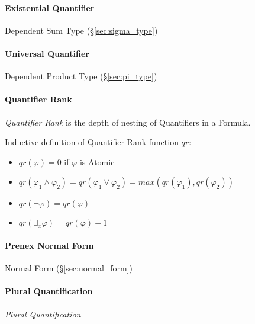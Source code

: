 \paragraph{Existential Quantifier}\label{sec:existential_quantifier}\hfill

Dependent Sum Type (\S\ref{sec:sigma_type})



\paragraph{Universal Quantifier}\label{sec:universal_quantifier}\hfill

Dependent Product Type (\S\ref{sec:pi_type})



\paragraph{Quantifier Rank}\label{sec:quantifier_rank}\hfill

\emph{Quantifier Rank} is the depth of nesting of Quantifiers in a
Formula.

Inductive definition of Quantifier Rank function $qr$:
\begin{itemize}
  \item $qr(\varphi) = 0$ if $\varphi$ is Atomic
  \item $qr(\varphi_1 \wedge \varphi_2) =
    qr(\varphi_1 \vee \varphi_2) = max(qr(\varphi_1),qr(\varphi_2))$
  \item $qr(\neg \varphi) = qr(\varphi)$
  \item $qr(\exists_x \varphi) = qr(\varphi) + 1$
\end{itemize}



\paragraph{Prenex Normal Form}\label{sec:prenex_normal}\hfill

Normal Form (\S\ref{sec:normal_form})



\paragraph{Plural Quantification}\label{sec:plural_quantification}
\hfill

\emph{Plural Quantification}



